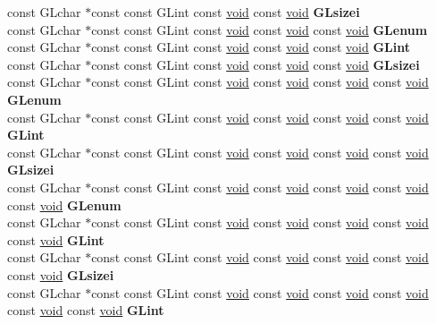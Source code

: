 \begin{DoxyCompactItemize}
\begin{tabbing}
\>const GLchar $\ast$const const GLint const \hyperlink{interfacevoid}{void} const \hyperlink{interfacevoid}{void} {\bfseries GLsizei}\\
\>const GLchar $\ast$const const GLint const \hyperlink{interfacevoid}{void} const \hyperlink{interfacevoid}{void} const \hyperlink{interfacevoid}{void} {\bfseries GLenum}\\
\>const GLchar $\ast$const const GLint const \hyperlink{interfacevoid}{void} const \hyperlink{interfacevoid}{void} const \hyperlink{interfacevoid}{void} {\bfseries GLint}\\
\>const GLchar $\ast$const const GLint const \hyperlink{interfacevoid}{void} const \hyperlink{interfacevoid}{void} const \hyperlink{interfacevoid}{void} {\bfseries GLsizei}\\
\>const GLchar $\ast$const const GLint const \hyperlink{interfacevoid}{void} const \hyperlink{interfacevoid}{void} const \hyperlink{interfacevoid}{void} const \hyperlink{interfacevoid}{void} {\bfseries GLenum}\\
\>const GLchar $\ast$const const GLint const \hyperlink{interfacevoid}{void} const \hyperlink{interfacevoid}{void} const \hyperlink{interfacevoid}{void} const \hyperlink{interfacevoid}{void} {\bfseries GLint}\\
\>const GLchar $\ast$const const GLint const \hyperlink{interfacevoid}{void} const \hyperlink{interfacevoid}{void} const \hyperlink{interfacevoid}{void} const \hyperlink{interfacevoid}{void} {\bfseries GLsizei}\\
\>const GLchar $\ast$const const GLint const \hyperlink{interfacevoid}{void} const \hyperlink{interfacevoid}{void} const \hyperlink{interfacevoid}{void} const \hyperlink{interfacevoid}{void} const \hyperlink{interfacevoid}{void} {\bfseries GLenum}\\
\>const GLchar $\ast$const const GLint const \hyperlink{interfacevoid}{void} const \hyperlink{interfacevoid}{void} const \hyperlink{interfacevoid}{void} const \hyperlink{interfacevoid}{void} const \hyperlink{interfacevoid}{void} {\bfseries GLint}\\
\>const GLchar $\ast$const const GLint const \hyperlink{interfacevoid}{void} const \hyperlink{interfacevoid}{void} const \hyperlink{interfacevoid}{void} const \hyperlink{interfacevoid}{void} const \hyperlink{interfacevoid}{void} {\bfseries GLsizei}\\
\>const GLchar $\ast$const const GLint const \hyperlink{interfacevoid}{void} const \hyperlink{interfacevoid}{void} const \hyperlink{interfacevoid}{void} const \hyperlink{interfacevoid}{void} const \hyperlink{interfacevoid}{void} const \hyperlink{interfacevoid}{void} {\bfseries GLint}\\

\end{tabbing}
\end{DoxyCompactItemize}
